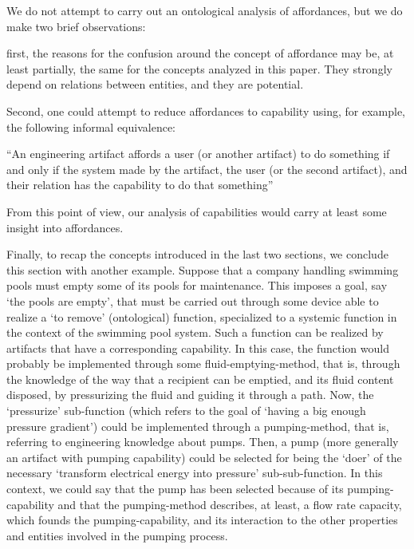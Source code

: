 \documentclass[sw]{iosart2x}
\newcommand{\bflist}{\begin{list}{}{\setlength{\topsep}{2mm}\setlength{\partopsep}{0mm}\setlength{\parsep}{0mm}\setlength{\leftmargin}{9mm}\setlength{\labelwidth}{8mm}}}
\newcommand{\eflist}{\end{list}}
\newcommand{\ExLabel}{\textrm{ex}}
\newcommand{\myex}[1]{\refstepcounter{cntex}\begin{small}{\bf \ExLabel\thecntex\label{ex:#1}}\end{small}}
\newcounter{cntex}
\newcommand{\mytext}[1]{``#1''}
\newcommand{\myComment}[1]{{\unskip \ignorespaces}}
\begin{document}
We do not attempt to carry out an ontological analysis of affordances, but we do make two brief observations:
\begin{itemize}
  \item first, the reasons for the confusion around the concept of affordance may be, at least partially, the same for the concepts analyzed in this paper. They strongly depend on relations between entities, and they are potential.
  \item Second, one could attempt to reduce affordances to capability using, for example, the following informal equivalence:
  \bflist
    \item[\myex{affordances}] \mytext{An engineering artifact affords a user (or another artifact) to do something if and only if the system made by the artifact, the user (or the second artifact), and their relation has the capability to do that something}
  \eflist 
\end{itemize}
From this point of view, our analysis of capabilities would carry at least some insight into affordances.

Finally, to recap the concepts introduced in the last two sections, we conclude this section with another example.\myComment{\footnote{Notice again the similarity with the work of Kitamura, Sasajima, Mizoguchi et al. \cite{kitamuraOntologybasedDescriptionFunctional2003}.}} Suppose that a company handling swimming pools must empty some of its pools for maintenance. This imposes a goal, say `the pools are empty', that must be carried out through some device able to realize a `to remove' (ontological) function, specialized to a systemic function in the context of the swimming pool system.
Such a function can be realized by artifacts that have a corresponding capability. In this case, the function would probably be implemented through some fluid-emptying-method, that is, through the knowledge of the way that a recipient can be emptied, and its fluid content disposed, by pressurizing the fluid and guiding it through a path.
Now, the `pressurize' sub-function (which refers to the goal of `having a big enough pressure gradient') could be implemented through a pumping-method, that is, referring to engineering knowledge about pumps.
Then, a pump (more generally an artifact with pumping capability) could be selected for being the `doer' of the necessary `transform electrical energy into pressure' sub-sub-function.
In this context, we could say that the pump has been selected because of its pumping-capability and that the pumping-method describes, at least, a flow rate capacity, which founds the pumping-capability, and its interaction to the other properties and entities involved in the pumping process. 
\end{document}
